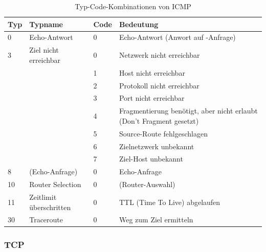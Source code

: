\begin{table}[htbp]
	\centering
	\begin{tabular}{|l|l|l|p{9cm}|}\hline
		Typ & Typname & Code & Bedeutung \\ \hline \hline
		0 & Echo-Antwort & 0 & Echo-Antwort (Anwort auf \code{ping}-Anfrage) \\ \hline
		3 & Ziel nicht erreichbar & 0 & Netzwerk nicht erreichbar \\

		\multirow{3}{*}{} 
			&  & 1 & Host nicht erreichbar \\
			&  & 2 & Protokoll nicht erreichbar \\ 
			&  & 3 & Port nicht erreichbar \\
	    	&  & 4 & Fragmentierung benötigt, aber nicht erlaubt (Don't Fragment gesetzt) \\
	    	&  & 5 & Source-Route fehlgeschlagen \\ 
	    	&  & 6 & Zielnetzwerk unbekannt \\
	    	&  & 7 & Ziel-Host unbekannt \tabularnewline \hline
		8 & \code{ping} (Echo-Anfrage) & 0 & Echo-Anfrage \\ \hline
		10 & Router Selection & 0 & (Router-Auswahl) \\ \hline
		11 & Zeitlimit überschritten & 0 & TTL (Time To Live) abgelaufen \\ \hline
	 	30 & Traceroute & 0 & Weg zum Ziel ermitteln \\ \hline
	\end{tabular}\caption[Typ-Code-Kombinationen von ICMP]{Typ-Code-Kombinationen von ICMP}\label{icmp}
\end{table}

\subsubsection{TCP}

